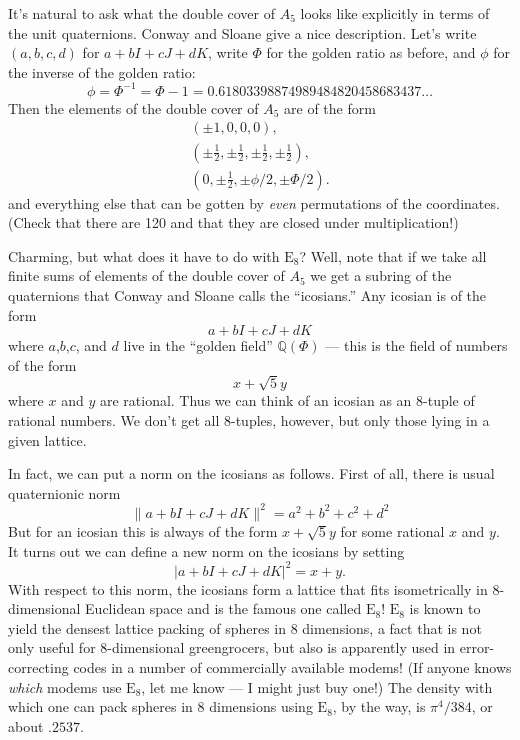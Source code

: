 \documentclass[12pt]{article}
\begin{document}
It's natural to ask what the double cover of \(A_5\) looks like
explicitly in terms of the unit quaternions. Conway and Sloane give a
nice description. Let's write \((a,b,c,d)\) for \(a + bI + cJ + dK\),
write \(\Phi\) for the golden ratio as before, and \(\phi\) for the inverse of
the golden ratio:
\[\phi = \Phi^{-1} = \Phi -1 = 0.61803398874989484820458683437\ldots\] Then the
elements of the double cover of \(A_5\) are of the form \[
  \begin{gathered}
    (\pm 1, 0, 0, 0),
  \\(\pm \frac{1}{2}, \pm \frac{1}{2}, \pm \frac{1}{2}, \pm \frac{1}{2}),
  \\(0, \pm\frac{1}{2}, \pm \phi/2, \pm \Phi/2).
  \end{gathered}
\] and everything else that can be gotten by \emph{even} permutations of
the coordinates. (Check that there are 120 and that they are closed
under multiplication!)

Charming, but what does it have to do with \(\mathrm{E}_8\)? Well, note
that if we take all finite sums of elements of the double cover of
\(A_5\) we get a subring of the quaternions that Conway and Sloane calls
the ``icosians.'' Any icosian is of the form \[a + bI + cJ + dK\] where
\(a\),\(b\),\(c\), and \(d\) live in the ``golden field''
\(\mathbb{Q}(\Phi)\) --- this is the field of numbers of the form
\[x + \sqrt{5} y\] where \(x\) and \(y\) are rational. Thus we can think
of an icosian as an 8-tuple of rational numbers. We don't get all
8-tuples, however, but only those lying in a given lattice.

In fact, we can put a norm on the icosians as follows. First of all,
there is usual quaternionic norm
\[\|a + bI + cJ + dK\|^2 = a^2 + b^2 + c^2 + d^2\] But for an icosian
this is always of the form \(x + \sqrt{5} y\) for some rational \(x\)
and \(y\). It turns out we can define a new norm on the icosians by
setting 
\[|a + bI + cJ + dK|^2 = x + y.\] 
With respect to this norm, the
icosians form a lattice that fits isometrically in \(8\)-dimensional
Euclidean space and is the famous one called \(\mathrm{E}_8\)!
\(\mathrm{E}_8\) is known to yield the densest lattice packing of
spheres in 8 dimensions, a fact that is not only useful for
8-dimensional greengrocers, but also is apparently used in
error-correcting codes in a number of commercially available modems! (If
anyone knows \emph{which} modems use \(\mathrm{E}_8\), let me know --- I
might just buy one!) The density with which one can pack spheres in 8
dimensions using \(\mathrm{E}_8\), by the way, is \(\pi^4/384\), or
about \(.2537\).
\end{document}
